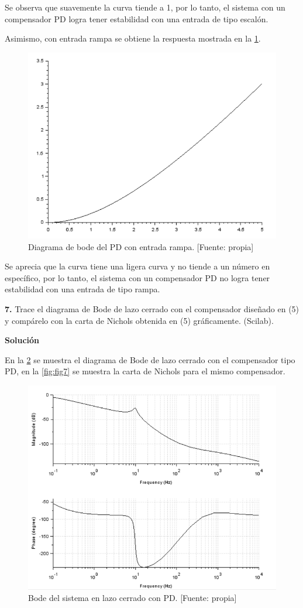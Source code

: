 \documentclass[12pt,letterpaper]{article}
\begin{document}
Se observa que suavemente la curva tiende a 1, por lo tanto, el sistema con un compensador PD logra tener estabilidad con una entrada de tipo escalón.

Asimismo, con entrada rampa se obtiene la respuesta mostrada en la \ref{fig:fig9}.

\begin{figure}[hbtp]
	\centering
	\includegraphics[width = .65 \columnwidth]{6rampa.png} 
	\caption[Figura7]{Diagrama de bode del PD con entrada rampa. [Fuente: propia]} 
	\label{fig:fig9} 
\end{figure}
Se aprecia que la curva tiene una ligera curva y no tiende a un número en específico, por lo tanto, el sistema con un compensador PD no logra tener estabilidad con una entrada de tipo rampa.

\textbf{7.} Trace el diagrama de Bode de lazo cerrado con el compensador diseñado en (5) y compárelo con la carta de Nichols obtenida en (5) gráficamente. (Scilab).

\bigskip

\textbf{Solución}

\bigskip

En la \ref{fig:bodePD} se muestra el diagrama de Bode de lazo cerrado con el compensador tipo PD, en la \ref{fig:fig7} se muestra la carta de Nichols para el mismo compensador.

\begin{figure}[hbtp]
	\centering
	\includegraphics[width = .65 \columnwidth]{BodePD.png} 
	\caption[Figura7]{Bode del sistema en lazo cerrado con PD. [Fuente: propia]} 
	\label{fig:bodePD} 
\end{figure}
\end{document}

